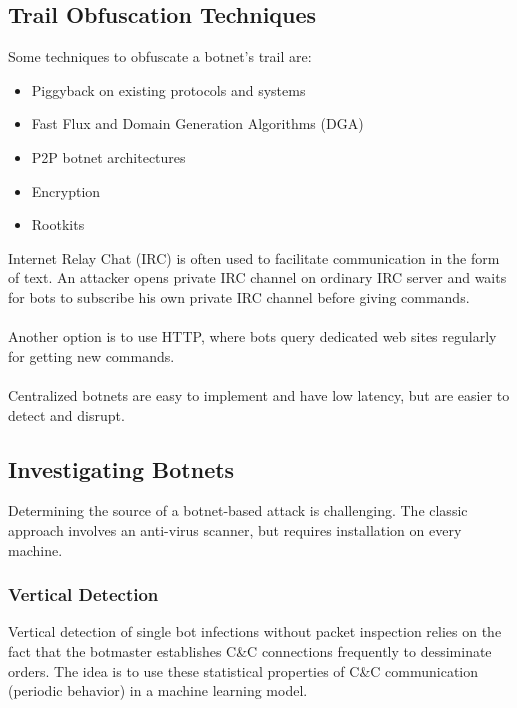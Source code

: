 \documentclass[10pt,a4paper]{report}
\begin{document}
\subsection{Trail Obfuscation Techniques}
Some techniques to obfuscate a botnet's trail are:
\begin{itemize}
\item Piggyback on existing protocols and systems
\item Fast Flux and Domain Generation Algorithms (DGA)
\item P2P botnet architectures
\item Encryption
\item Rootkits
\end{itemize}
Internet Relay Chat (IRC) is often used to facilitate communication in the form of text. An attacker opens private IRC channel on ordinary IRC server and waits for bots to subscribe his own private IRC channel before giving commands.\\
\\
Another option is to use HTTP, where  bots query dedicated web sites regularly for getting new commands.\\
\\
Centralized botnets are easy to implement and have low latency, but are easier to detect and disrupt.
\subsection{Investigating Botnets}
Determining the source of a botnet-based attack is challenging. The classic approach involves an anti-virus scanner, but requires installation on every machine.
\subsubsection{Vertical Detection}
Vertical detection of single bot infections without packet inspection relies on the fact that the botmaster establishes C\&C connections frequently to dessiminate orders. The idea is to use these statistical properties of C\&C communication (periodic behavior) in a machine learning model.
\end{document}
